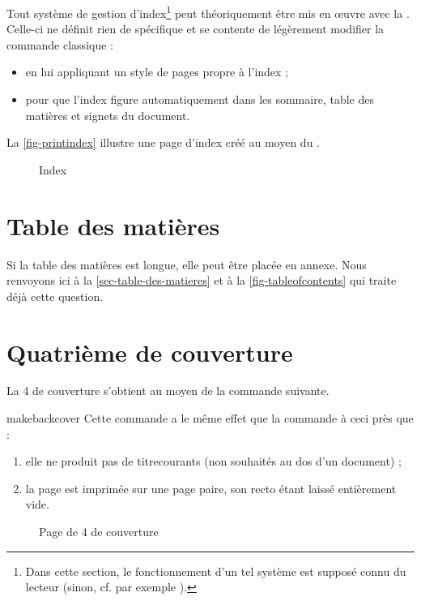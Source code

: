 Tout système de gestion d'index\footnote{Dans cette section, le fonctionnement
  d'un tel système est supposé connu du lecteur (sinon, cf. par exemple
  \cite{en-ligne7}).} peut théoriquement être mis en œuvre avec la
\yatCl. Celle-ci ne définit rien de spécifique et se contente de légèrement
modifier la commande  classique :
\begin{itemize}
\item en lui appliquant un style de pages propre à l'index ;
\item pour que l'index figure automatiquement dans les
  sommaire, table des matières et signets du document.
\end{itemize}

La \vref{fig-printindex} illustre une page d'index créé au moyen du
.

\begin{figure}[htbp]
  \centering
  \caption{Index}
  \label{fig-printindex}
\end{figure}

\section{Table des matières}
%

Si la table des matières est longue, elle peut être placée en
annexe. Nous renvoyons ici à la \vref{sec-table-des-matieres} et à
la \vref{fig-tableofcontents} qui traite déjà cette question.

\section{Quatrième de couverture}\label{sec-quatr-de-couv}
%
%

La 4\ieme{} de couverture s'obtient au moyen de la commande
 suivante.

\begin{docCommand}{makebackcover}{}
  Cette commande a le même effet que la commande 
  à ceci près que :
  \begin{enumerate}
  \item elle ne produit pas de \glspl{titrecourant} (non souhaités au dos d'un
    document) ;
  \item la page est imprimée sur une page paire, son recto étant
    laissé entièrement vide.
  \end{enumerate}
\end{docCommand}

\begin{figure}[htbp]
  \centering
  \caption{Page de 4\ieme{} de couverture}
  \label{fig-makebackcover}
\end{figure}

